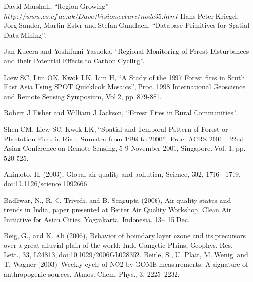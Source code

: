 \documentclass[12pt]{report}	%
\begin{document}
\begin{thebibliography}{99}
David Marshall, “Region Growing”-$http://www.cs.cf.ac.uk/Dave/Vision_lecture/node35.h
tml$
Hans-Peter Kriegel, Jorg Sander, Martin Ester and
Stefan Gundlach, “Database Primitives for Spatial
Data Mining”.

Jan Kucera and Yoshifumi Yasuoka, “Regional
Monitoring of Forest Disturbances and their Potential
Effects to Carbon Cycling”.

Liew SC, Lim OK, Kwok LK, Lim H, “A Study of
the 1997 Forest fires in South East Asia Using SPOT
Quicklook Mosaics”, Proc. 1998 International
Geoscience and Remote Sensing Symposium, Vol 2,
pp. 879-881.

Robert J Fisher and William J Jackson, “Forest Fires
in Rural Communities”.

Shen CM, Liew SC, Kwok LK, “Spatial and
Temporal Pattern of Forest or Plantation Fires in Riau,
Sumatra from 1998 to 2000”, Proc. ACRS 2001 -
22nd Asian Conference on Remote Sensing, 5-9
November 2001, Singapore. Vol. 1, pp. 520-525.

Akimoto, H. (2003), Global air quality and pollution, Science, 302,
1716– 1719, doi:10.1126/science.1092666.

Badhwar, N., R. C. Trivedi, and B. Sengupta (2006), Air quality status and
trends in India, paper presented at Better Air Quality Workshop, Clean
Air Initiative for Asian Cities, Yogyakarta, Indonesia, 13– 15 Dec.

Beig, G., and K. Ali (2006), Behavior of boundary layer ozone and its
precursors over a great alluvial plain of the world: Indo-Gangetic Plains,
Geophys. Res. Lett., 33, L24813, doi:10.1029/2006GL028352.
Beirle, S., U. Platt, M. Wenig, and T. Wagner (2003), Weekly cycle of NO2
by GOME measurements: A signature of anthropogenic sources, Atmos.
Chem. Phys., 3, 2225–2232.
\end{thebibliography}

\newpage
\end{document}
